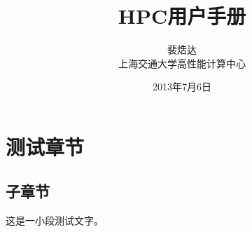 \documentclass[cs4size, a4paper, openany]{hpcmanual}
\title{HPC用户手册}
\author{裴焅达\\上海交通大学高性能计算中心}
\date{2013年7月6日}
\begin{document}
\section{测试章节}

\subsection{子章节}

这是一小段测试文字。
\end{document}
